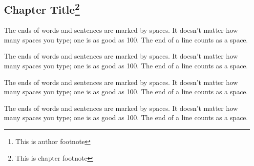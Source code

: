 \cleardoublepage
\begin{frontmatter}
\chapter{Chapter Title\footnote{This is chapter footnote}}

\begin{aug}
\author[addressrefs={ad1,ad2}]%
  {   \footnote{This is author footnote}}%
\author[addressrefs={ad2}]%
 { }%
\address[id=ad1]%
  {Short Address}%
\address[id=ad2]%
  {Long Address}%
\end{aug}



%
\begin{chapterpoints}%
\item The ends of words and sentences are marked by spaces. It doesn't
  matter how many spaces you type; one is as good as 100.  The end of
  a line counts as a space.

\item The ends of words and sentences are marked by spaces. It doesn't
  matter how many spaces you type; one is as good as 100.  The end of
  a line counts as a space.
\end{chapterpoints}

\begin{dispquote}

  The ends of words and sentences are marked by spaces. It doesn't
  matter how many spaces you type; one is as good as 100.  The end of
  a line counts as a space.

  The ends of words and sentences are marked by spaces. It doesn't
  matter how many spaces you type; one is as good as 100.  The end of
  a line counts as a space.
  

\end{dispquote}

\end{frontmatter}
